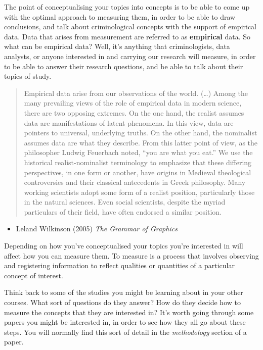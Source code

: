 \documentclass[
]{book}
\providecommand{\tightlist}{%
  \setlength{\itemsep}{0pt}\setlength{\parskip}{0pt}}
\begin{document}
The point of conceptualising your topics into concepts is to be able to come up with the optimal approach to measuring them, in order to be able to draw conclusions, and talk about criminological concepts with the support of empirical data. Data that arises from measurement are referred to as \textbf{empirical} data. So what can be empirical data? Well, it's anything that criminologists, data analysts, or anyone interested in and carrying our research will measure, in order to be able to answer their research questions, and be able to talk about their topics of study.

\begin{quote}
Empirical data arise from our observations of the world. (\ldots) Among the many prevailing views of the role of empirical data in modern science, there are two opposing extremes. On the one hand, the realist assumes data are manifestations of latent phenomena. In this view, data are pointers to universal, underlying truths. On the other hand, the nominalist assumes data are what they describe. From this latter point of view, as the philosopher Ludwig Feuerbach noted, ``you are what you eat.'' We use the historical realist-nominalist terminology to emphasize that these differing perspectives, in one form or another, have origins in Medieval theological controversies and their classical antecedents in Greek philosophy. Many working scientists adopt some form of a realist position, particularly those in the natural sciences. Even social scientists, despite the myriad particulars of their field, have often endorsed a similar position.
\end{quote}

\begin{itemize}
\tightlist
\item
  Leland Wilkinson (2005) \emph{The Grammar of Graphics}
\end{itemize}

Depending on how you've conceptualised your topics you're interested in will affect how you can measure them. To measure is a process that involves observing and registering information to reflect qualities or quantities of a particular concept of interest.

Think back to some of the studies you might be learning about in your other courses. What sort of questions do they answer? How do they decide how to measure the concepts that they are interested in? It's worth going through some papers you might be interested in, in order to see how they all go about these steps. You will normally find this sort of detail in the \emph{methodology} section of a paper.
\end{document}

